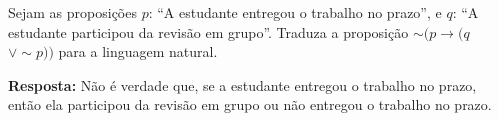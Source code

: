 \documentclass{ufcdocument}
\begin{document}
\def\course{Lógica para Ciência da Computação}
\def\prof{Esdras Lins Bispo Jr.}
\def\semester{2026.1}
\def\codeCourse{ICE0239}
\def\registration{}
\def\student{}
\def\graduate{Bacharelado em Ciência da Computação}
\def\theme{Avaliação da Competência LCC C1.1:\\ \texttt{Conversão da linguagem simbólica para a natural.}\\
09 de abril de 2026
}
    \makeheader
    
    \vspace{0.5cm}
    
    

        \begin{question}
            \item Sejam as proposições $p$: ``A estudante entregou o trabalho no prazo'', e $q$: ``A estudante participou da revisão em grupo''. Traduza a proposição $\sim (p \rightarrow (q$ $\vee \sim p))$ para a linguagem natural.
        \end{question}

    \vspace{0.3cm}
        
    {\color{blue} {\bf Resposta:} Não é verdade que, se a estudante entregou o trabalho no prazo, então ela participou da revisão em grupo ou não entregou o trabalho no prazo.}
 
    \vfill
\end{document}

